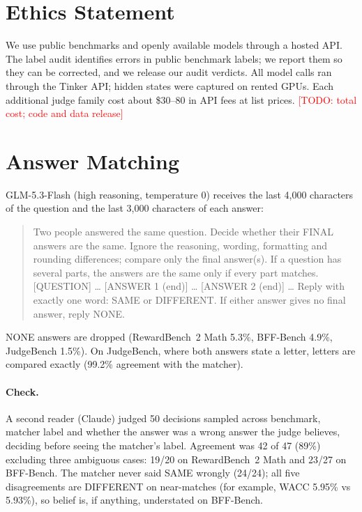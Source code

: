 \documentclass[11pt]{article}
\newcommand{\todo}[1]{\textcolor{red}{[TODO: #1]}}
\begin{document}
\section*{Ethics Statement}

We use public benchmarks and openly available models through a hosted API. The label audit identifies errors in
public benchmark labels; we report them so they can be corrected, and we release our audit verdicts.
All model calls ran through the Tinker API; hidden states were captured on rented GPUs. Each additional judge family cost about \$30--80 in API fees at list prices. \todo{total cost; code and data release}



\appendix

\section{Answer Matching}
\label{app:matcher}

GLM-5.3-Flash (high reasoning, temperature 0) receives the last 4,000 characters of the question and the last
3,000 characters of each answer:

\begin{quote}\small\ttfamily
Two people answered the same question. Decide whether their FINAL answers are the same. Ignore the reasoning,
wording, formatting and rounding differences; compare only the final answer(s). If a question has several parts,
the answers are the same only if every part matches. [QUESTION] \ldots{} [ANSWER 1 (end)] \ldots{} [ANSWER 2 (end)]
\ldots{} Reply with exactly one word: SAME or DIFFERENT. If either answer gives no final answer, reply NONE.
\end{quote}

NONE answers are dropped (RewardBench~2 Math 5.3\%, BFF-Bench 4.9\%, JudgeBench 1.5\%). On JudgeBench, where both
answers state a letter, letters are compared exactly (99.2\% agreement with the matcher).

\paragraph{Check.} A second reader (Claude) judged 50 decisions sampled across benchmark, matcher label and
whether the answer was a wrong answer the judge believes, deciding before seeing the matcher's label. Agreement was
42 of 47 (89\%) excluding three ambiguous cases: 19/20 on RewardBench~2 Math and 23/27 on BFF-Bench. The matcher
never said SAME wrongly (24/24); all five disagreements are DIFFERENT on near-matches (for example, WACC 5.95\% vs
5.93\%), so belief is, if anything, understated on BFF-Bench.
\end{document}
